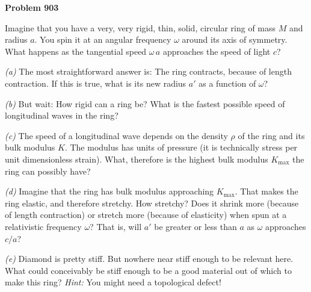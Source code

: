 \documentclass[12pt]{article}
\begin{document}
\begin{pottproblem}
\textbf{Problem 903}

Imagine that you have a very, very rigid, thin, solid, circular ring of mass $M$ and radius $a$.
You spin it at an angular frequency $\omega$ around its axis of symmetry.
What happens as the tangential speed $\omega\,a$ approaches the speed of light $c$?

\textsl{(a)} The most straightforward answer is: The ring contracts, because of length contraction.
If this is true, what is its new radius $a'$ as a function of $\omega$?

\textsl{(b)} But wait: How rigid can a ring be? What is the fastest possible speed of
longitudinal waves in the ring?

\textsl{(c)} The speed of a longitudinal wave depends on the density $\rho$ of the ring and its
bulk modulus $K$. The modulus has units of pressure (it is technically stress per unit dimensionless strain).
What, therefore is the highest bulk modulus $K_\mathrm{max}$ the ring can possibly have?

\textsl{(d)} Imagine that the ring has bulk modulus approaching $K_\mathrm{max}$.
That makes the ring elastic, and therefore stretchy.
How stretchy? Does it shrink more (because of length contraction) or stretch more (because of elasticity)
when spun at a relativistic frequency $\omega$?
That is, will $a'$ be greater or less than $a$ as $\omega$ approaches $c/a$?

\textsl{(e)} Diamond is pretty stiff. But nowhere near stiff enough to be relevant here.
What could conceivably be stiff enough to be a good material out of which to make this ring?
\textsl{Hint:} You might need a topological defect!

\end{pottproblem}
\end{document}
